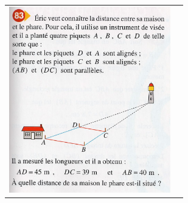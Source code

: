 \documentclass[12pt, twoside]{article}
\begin{document}
\begin{tabular}{cc}
\begin{minipage}{9cm}
\enskip

\includegraphics[width=7cm]{images/ex83.jpg}
\end{minipage}
\end{tabular}
\end{document}
